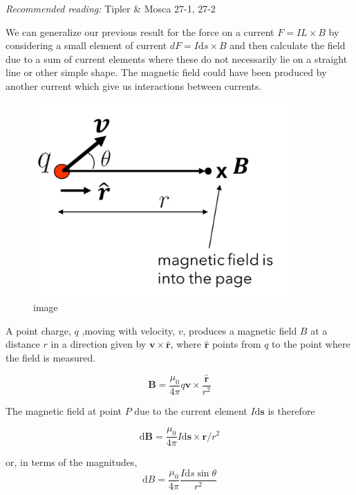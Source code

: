 \documentclass[
]{book}
\numberwithin{equation}{section}
\begin{document}
\emph{Recommended reading:} Tipler \& Mosca 27-1, 27-2

We can generalize our previous result for the force on a current
\(F = IL \times B\) by considering a small element of current
\(dF = I \mathrm{d} s \times B\) and then calculate the field due to a sum of
current elements where these do not necessarily lie on a straight line
or other simple shape. The magnetic field could have been produced by
another current which give us interactions between currents.

\begin{figure}
\centering
\includegraphics[width=100mm,height=\textheight]{Figures/fieldmovingcharge.png}
\caption{image}
\end{figure}

A point charge, \(q\) ,moving with velocity, \(v\), produces a magnetic
field \(B\) at a distance \(r\) in a direction given by
\(\mathbf{v} \times \hat{\mathbf{r}}\), where \(\hat{\mathbf{r}}\) points from \(q\) to the point
where the field is measured.

\begin{equation}
\label{eq:Bfield}
\mathbf{B} = \frac{\mu_0}{4\pi} q \mathbf{v} \times \frac{\hat{\mathbf{r}}}{r^2} 
\end{equation}

The magnetic field at point \(P\) due to the current element \(I \mathrm{d}\mathbf{s}\) is
therefore

\begin{equation}
\label{eq:BIelement}
\mathrm{d} \mathbf{B} = \frac{\mu_0}{4\pi}  I \mathrm{d}\mathbf{s} \times \mathbf{r} /r^2 
\end{equation}

or, in terms of the magnitudes,
\begin{equation}
\label{eq:magBI}
\mathrm{d} B = \frac{\mu_0}{4\pi}  \frac{I \mathrm{d} s  \sin\theta}{r^2} 
\end{equation}
\end{document}
